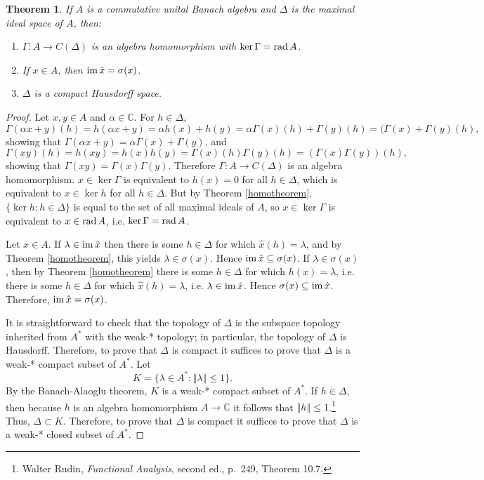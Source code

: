 \documentclass{article}
\newcommand{\im}{\ensuremath\mathrm{im}\,}
\newcommand{\rad}{\ensuremath\mathrm{rad}\,}
\newcommand{\norm}[1]{\left\Vert #1 \right\Vert}
\newtheorem{theorem}{Theorem}
\theoremstyle{definition}
\begin{document}
\begin{theorem}
If $A$ is a commutative unital Banach algebra and $\Delta$ is the maximal ideal space of $A$, then:
\begin{enumerate}
\item $\Gamma:A \to C(\Delta)$ is an algebra homomorphism with $\ker \Gamma=\rad A$.
\item If $x \in A$, then $\im \hat{x}=\sigma(x)$.
\item $\Delta$ is a compact Hausdorff space.
\end{enumerate}
\label{gelfand}
\end{theorem}
\begin{proof}
Let $x,y \in A$ and $\alpha \in \mathbb{C}$. For $h \in \Delta$,
\[
\Gamma(\alpha x+y)(h) = h(\alpha x+y) = \alpha h(x)+h(y) =\alpha \Gamma(x)(h)+\Gamma(y)(h)= (\Gamma(x)+\Gamma(y)(h),
\]
showing that $\Gamma(\alpha x+y)=\alpha\Gamma(x)+\Gamma(y)$, and
\[
\Gamma(xy)(h)=h(xy)=h(x)h(y)=\Gamma(x)(h) \Gamma(y)(h) = (\Gamma(x)\Gamma(y))(h),
\]
showing that $\Gamma(xy)=\Gamma(x)\Gamma(y)$. Therefore $\Gamma:A \to C(\Delta)$ is an algebra homomorphism.
$x \in \ker \Gamma$ is equivalent to $h(x)=0$ for all $h \in \Delta$, which is equivalent to $x \in \ker h$ for all $h \in \Delta$. But by Theorem \ref{homotheorem}, $\{\ker h: h \in \Delta\}$
is equal to the set of all maximal ideals of $A$, so $x \in \ker \Gamma$ is equivalent to $x \in \rad A$, i.e. $\ker \Gamma=\rad A$.

Let $x \in A$.
If $\lambda \in \im \hat{x}$ then there is some $h \in \Delta$ for which $\hat{x}(h)=\lambda$, and by 
Theorem \ref{homotheorem}, 
this yields $\lambda \in \sigma(x)$. Hence $\im \hat{x} \subseteq \sigma(x)$. If $\lambda \in \sigma(x)$, then by Theorem \ref{homotheorem}
there is some $h \in \Delta$ for which $h(x)=\lambda$, i.e. there is some $h \in \Delta$ for which $\hat{x}(h)=\lambda$, i.e. $\lambda \in \im \hat{x}$. Hence
$\sigma(x) \subseteq \im \hat{x}$. Therefore, $\im \hat{x} = \sigma(x)$.

It is straightforward to check that the topology of $\Delta$ is the subspace topology inherited from $A^*$ with the weak-* topology;
in particular, the topology of $\Delta$ is Hausdorff.
Therefore, to prove that $\Delta$ is compact it suffices to prove that $\Delta$ is a weak-* compact subset of $A^*$.
Let
\[
K=\{\lambda \in A^*: \norm{\lambda} \leq 1\}.
\]
By the Banach-Alaoglu theorem, $K$ is a weak-* compact subset of $A^*$. 
If $h \in \Delta$, then because $h$ is an algebra homomorphism $A \to \mathbb{C}$ it follows that $\norm{h} \leq 1$.\footnote{Walter Rudin, {\em Functional Analysis}, second ed., p.~249, Theorem 10.7.} Thus, $\Delta \subset K$. Therefore, to prove that $\Delta$ is compact it suffices to prove that $\Delta$ is a weak-*
closed subset of $A^*$.


\end{proof}
\end{document}
